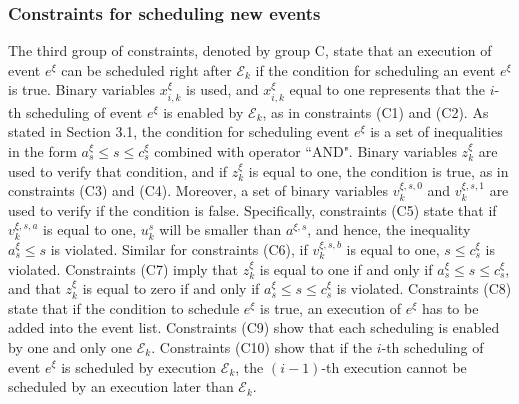 \documentclass[]{interact}
\theoremstyle{plain}%
\theoremstyle{definition}
\theoremstyle{remark}
\begin{document}
\subsubsection{Constraints for scheduling new events}
The third group of constraints, denoted by group C, state that an execution of event $e^{\xi}$ can be scheduled right after $\mathcal{E}_k$ if the condition for scheduling an event $e^{\xi}$ is true. Binary variables $x^{\xi}_{i,k}$ is used, and $x^{\xi}_{i,k}$ equal to one represents that the $i$-th scheduling of event $e^{\xi}$ is enabled by $\mathcal{E}_k$, as in constraints (C1) and (C2). As stated in Section 3.1, the condition for scheduling event $e^{\xi}$ is a set of inequalities in the form $a^{\xi}_s\le s \le c^{\xi}_s$ combined with operator ``AND". Binary variables $z^{\xi}_{k}$ are used to verify that condition, and if $z^{\xi}_{k}$ is equal to one, the condition is true, as in constraints (C3) and (C4). Moreover, a set of binary variables $v^{\xi,s,0}_k$ and $v^{\xi,s,1}_k$ are used to verify if the condition is false. Specifically, constraints (C5) state that if  $v^{\xi,s,a}_k$ is equal to one, $u^s_k$ will be smaller than $a^{\xi,s}$, and hence, the inequality $a^{\xi}_s\le s$ is violated. Similar for constraints (C6), if $v^{\xi,s,b}_k$ is equal to one, $s \le c^{\xi}_s$ is violated. Constraints (C7) imply that $z^{\xi}_{k}$ is equal to one if and only if $a^{\xi}_s\le s \le c^{\xi}_s$, and that $z^{\xi}_{k}$ is equal to zero if and only if $a^{\xi}_s\le s \le c^{\xi}_s$ is violated. Constraints (C8) state that if the condition to schedule $e^{\xi}$ is true, an execution of $e^{\xi}$ has to be added into the event list. Constraints (C9) show that each scheduling is enabled by one and only one $\mathcal{E}_{k}$. Constraints (C10) show that if the $i$-th scheduling of event $e^{\xi}$ is scheduled by execution $\mathcal{E}_{k}$, the $(i-1)$-th execution cannot be scheduled by an execution later than $\mathcal{E}_{k}$. 
\end{document}
